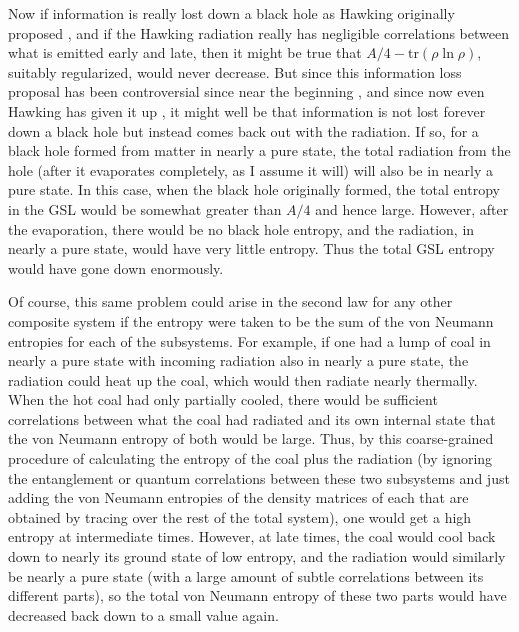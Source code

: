 \documentclass[12pt]{article} \usepackage{latexsym} \textwidth 15cm
\begin{document}
Now if information is really lost down a black hole as Hawking
originally proposed \cite{Haw76b}, and if the Hawking radiation really
has negligible correlations between what is emitted early and late,
then it might be true that $A/4 -{\mathrm{tr}}(\rho\ln\rho)$, suitably
regularized, would never decrease.  But since this information loss
proposal has been controversial since near the beginning
\cite{Page80,Pagereview}, and since now even Hawking has given it up
\cite{HawGR17}, it might well be that information is not lost forever
down a black hole but instead comes back out with the radiation.  If
so, for a black hole formed from matter in nearly a pure state, the
total radiation from the hole (after it evaporates completely, as I
assume it will) will also be in nearly a pure state.  In this case,
when the black hole originally formed, the total entropy in the GSL
would be somewhat greater than $A/4$ and hence large.  However, after
the evaporation, there would be no black hole entropy, and the
radiation, in nearly a pure state, would have very little entropy.
Thus the total GSL entropy would have gone down enormously.

Of course, this same problem could arise in the second law for any
other composite system if the entropy were taken to be the sum of the
von Neumann entropies for each of the subsystems.  For example, if one
had a lump of coal in nearly a pure state with incoming radiation also
in nearly a pure state, the radiation could heat up the coal, which
would then radiate nearly thermally.  When the hot coal had only
partially cooled, there would be sufficient correlations between what
the coal had radiated and its own internal state that the von Neumann
entropy of both would be large.  Thus, by this coarse-grained
procedure of calculating the entropy of the coal plus the radiation
(by ignoring the entanglement or quantum correlations between these
two subsystems and just adding the von Neumann entropies of the
density matrices of each that are obtained by tracing over the rest of
the total system), one would get a high entropy at intermediate times.
However, at late times, the coal would cool back down to nearly its
ground state of low entropy, and the radiation would similarly be
nearly a pure state (with a large amount of subtle correlations
between its different parts), so the total von Neumann entropy of these
two parts would have decreased back down to a small value again.
\end{document}
